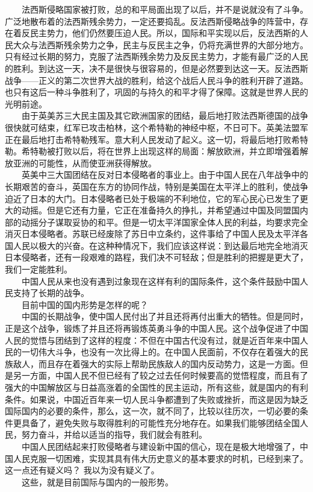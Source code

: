 \documentclass[cn,11pt,chinese]{elegantbook}
\begin{document}
　　法西斯侵略国家被打败，总的和平局面出现了以后，并不是说就没有了斗争。广泛地散布着的法西斯残余势力，一定还要捣乱。反法西斯侵略战争的阵营中，存在着反民主势力，他们仍然要压迫人民。所以，国际和平实现以后，反法西斯的人民大众与法西斯残余势力之争，民主与反民主之争，仍将充满世界的大部分地方。只有经过长期的努力，克服了法西斯残余势力及反民主势力，才能有最广泛的人民的胜利。到达这一天，决不是很快与很容易的，但是必然要到达这一天。反法西斯战争——正义的第二次世界大战的胜利，给这个战后人民斗争的胜利开辟了道路。也只有这后一种斗争胜利了，巩固的与持久的和平才得了保障。这就是世界人民的光明前途。\\
　　由于英美苏三大民主国及其它欧洲国家的团结，最后地打败法西斯德国的战争很快就可结束，红军已攻击柏林，这个希特勒的神经中枢，不日可下。英美法盟军正在最后地打击希特勒残军。意大利人民发动了起义。这一切，将最后地打败希特勒。希特勒被打败以后，将在世界上出现这样的局面：解放欧洲，并立即增强着解放亚洲的可能性，从而使亚洲获得解放。\\
　　英美中三大国团结在反对日本侵略者的事业上。由于中国人民在八年战争中的长期艰苦的奋斗，英国在东方的协同作战，特别是美国在太平洋上的胜利，使战争迫近了日本的大门。日本侵略者已处于极端的不利地位，它的军心民心已发生了更大的动摇。但是它还有力量，它正在准备持久的挣扎，并希望通过中国及同盟国内部的动摇分子谋取妥协的和平。但是一切太平洋国家全体人民的利益，均要求完全消灭日本侵略者。苏联已经废除了苏日中立条约，这件事给了中国人民及太平洋各国人民以极大的兴奋。在这种种情况下，我们应该这样说：到达最后地完全地消灭日本侵略者，还有一段艰难的路程，我们决不可轻敌；但是胜利的把握是更大了，我们一定能胜利。\\
　　中国人民从来也没有遇到过象现在这样有利的国际条件，这个条件鼓励中国人民支持了长期的战争。\\
　　目前中国的国内形势是怎样的呢？\\
　　中国的长期战争，使中国人民付出了并且还将再付出重大的牺牲。但是同时，正是这个战争，锻炼了并且还将再锻炼英勇斗争的中国人民。这个战争促进了中国人民的觉悟与团结到了这样的程度：不但在中国古代没有过，就是近百年来中国人民的一切伟大斗争，也没有一次比得上的。在中国人民面前，不仅存在着强大的民族敌人，而且存在着强大的实际上帮助民族敌人的国内反动势力，这是一方面。但是另一方面，中国人民不但已经有了较之过去任何时候要高的觉悟程度，而且有了强大的中国解放区与日益高涨着的全国性的民主运动，所有这些，就是国内的有利条件。如果说，中国近百年来一切人民斗争都遭到了失败或挫折，而这是因为缺乏国际国内的必要的条件，那么，这一次，就不同了，比较以往历次，一切必要的条件更具备了，避免失败与取得胜利的可能性充分地存在。如果我们能够团结全国人民，努力奋斗，并给以适当的指导，我们就会有胜利。\\
　　中国人民团结起来打败侵略者与建设新中国的信心，现在是极大地增强了，中国人民克服一切困难，实现其具有伟大历史意义的基本要求的时机，已经到来了。这一点还有疑义吗？ 我以为没有疑义了。\\
　　这些，就是目前国际与国内的一般形势。\\
\end{document}
